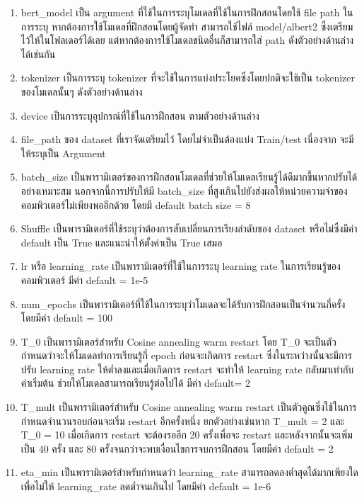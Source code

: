 \begin{enumerate} 
    \item
    bert\_model เป็น argument ที่ใช้ในการระบุโมเดลที่ใช้ในการฝึกสอนโดยใช้ file path ในการระบุ หากต้องการใช้โมเดลที่ฝึกสอนโดยผู้จัดทำ สามารถใช้ไฟล์ model/albert2 ซึ่งเตรียมไว้ให้ในโฟลเดอร์ได้เลย
    แต่หากต้องการใช้โมเดลชนิดอื่นก็สามารถใส่ path ดังตัวอย่างด้านล่างได้เช่นกัน
    \item
    tokenizer เป็นการระบุ tokenizer ที่จะใช้ในการแบ่งประโยคซึ่งโดยปกติจะใช้เป็น
    tokenizer ของโมเดลนั้นๆ ดังตัวอย่างด้านล่าง
    \item
    device เป็นการระบุอุปกรณ์ที่ใช้ในการฝึกสอน ตามตัวอย่างด้านล่าง
    \item
    file\_path ของ dataset ที่เราจัดเตรียมไว้ 
    โดยไม่จำเป็นต้องแบ่ง Train/test เนื่องจาก จะมีให้ระบุเป็น Argument 
    \item
    batch\_size เป็นพารามิเตอร์ของการฝึกสอนโมเดลที่ช่วยให้โมเดลเรียนรู้ได้ดีมากขึ้นหากปรับได้อย่างเหมาะสม 
    นอกจากนี้การปรับให้มี batch\_size ที่สูงเกินไปยังส่งผลให้หน่วยความจำของคอมพิวเตอร์ไม่เพียงพออีกด้วย โดยมี default batch size = 8
    \item
    Shuffle เป็นพารามิเตอร์ที่ใช้ระบุว่าต้องการสับเปลี่ยนการเรียงลำดับของ dataset 
    หรือไม่ซึ่งมีค่า default เป็น True และแนะนำให้ตั้งค่าเป็น True เสมอ
    \item
    lr หรือ learning\_rate เป็นพารามิเตอร์ที่ใช้ในการระบุ 
    learning rate ในการเรียนรู้ของคอมพิวเตอร์ มีค่า default = 1e-5
    \item
    num\_epochs เป็นพารามิเตอร์ที่ใช้ในการระบุว่าโมเดลจะได้รับการฝึกสอนเป็นจำนวนกี่ครั้ง 
    โดยมีค่า default = 100
    \item
    T\_0 เป็นพารามิเตอร์สำหรับ Cosine annealing warm restart โดย T\_0 จะเป็นตัวกำหนดว่าจะให้โมเดลทำการเรียนรู้กี่ epoch ก่อนจะเกิดการ restart ซึ่งในระหว่างนั้นจะมีการปรับ learning rate ให้ต่ำลงและเมื่อเกิดการ restart จะทำให้ learning rate 
    กลับมาเท่ากับค่าเริ่มต้น ช่วยให้โมเดลสามารถเรียนรู้ต่อไปได้ มีค่า default= 2
    \item
    T\_mult เป็นพารามิเตอร์สำหรับ Cosine annealing warm restart เป็นตัวคูณซึ่งใช้ในการกำหนดจำนวนรอบก่อนจะเริ่ม restart อีกครั้งหนึ่ง ยกตัวอย่างเช่นหาก T\_mult = 2 และ T\_0 = 10 เมื่อเกิดการ restart จะต้องรออีก 20 ครั้งเพื่อจะ restart และหลังจากนั้นจะเพิ่มเป็น 40 ครั้ง 
    และ 80 ครั้งจนกว่าจะพบเงื่อนไขการจบการฝึกสอน โดยมีค่า default = 2
    \item
    eta\_min เป็นพารามิเตอร์สำหรับกำหนดว่า learning\_rate สามารถลดลงต่ำสุดได้มากเพียงใด 
    เพื่อไม่ให้ learning\_rate ลดต่ำจนเกินไป โดยมีค่า default = 1e-6

\end{enumerate}
